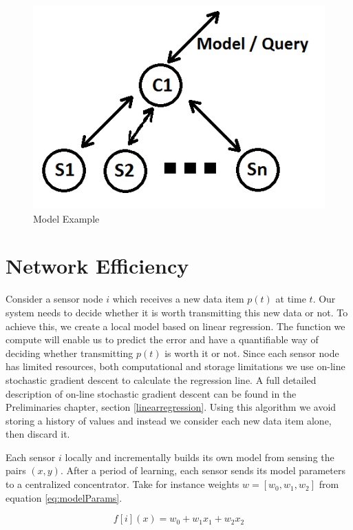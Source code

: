 \documentclass{mproj}
\begin{document}
\begin{figure}[H]
\caption{Model Example}
\label{fig:sn}
\centerline{\includegraphics[scale=0.5]{sensornetwork}}
\end{figure}

\section{Network Efficiency}
Consider a sensor node $i$ which receives a new data item $p(t)$ at time $t$. Our system needs to decide whether it is worth transmitting this new data or not. To achieve this, we create a local model based on linear regression. The function we compute will enable us to predict the error and have a quantifiable way of deciding whether transmitting $p(t)$ is worth it or not. Since each sensor node has limited resources, both computational and storage limitations we use on-line stochastic gradient descent to calculate the regression line. A full detailed description of on-line stochastic gradient descent can be found in the Preliminaries chapter, section \ref{linearregression}. Using this algorithm we avoid storing a history of values and instead we consider each new data item alone, then discard it. 

Each sensor $i$ locally and incrementally builds its own model from sensing the pairs $(x,y)$. After a period of learning, each sensor sends its model parameters to a centralized concentrator. Take for instance weights $w=[w_0,w_1,w_2]$ from equation \ref{eq:modelParams}. 

\begin{equation}
\label{eq:modelParams}
f[i](x) = w_0 + w_1x_1 + w_2x_2
\end{equation}
\end{document}
